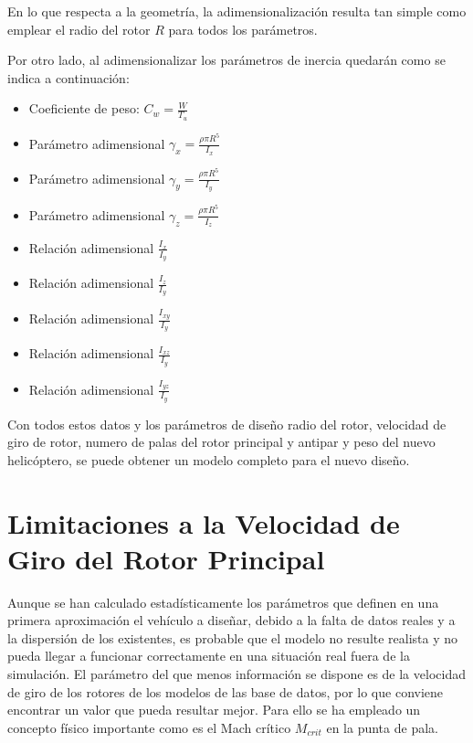 En lo que respecta a la geometría, la adimensionalización resulta tan simple como emplear el radio del rotor $R$ para todos los parámetros.

Por otro lado, al adimensionalizar los parámetros de inercia quedarán como se indica a continuación:

\singlespacing
\begin{multicols}{2}
	\begin{itemize}
		\item Coeficiente de peso: $C_w=\frac{W}{T_u}$
		\item Parámetro adimensional $\gamma_x=\frac{\rho\pi R^5}{I_x}$
		\item Parámetro adimensional $\gamma_y=\frac{\rho\pi R^5}{I_y}$
		\item Parámetro adimensional $\gamma_z=\frac{\rho\pi R^5}{I_z}$
		\item Relación adimensional $\frac{I_x}{I_y}$
		\item Relación adimensional $\frac{I_z}{I_y}$
		\item Relación adimensional $\frac{I_{xy}}{I_y}$
		\item Relación adimensional $\frac{I_{xz}}{I_y}$
		\item Relación adimensional $\frac{I_{yz}}{I_y}$
	\end{itemize}
\end{multicols}

Con todos estos datos y los parámetros de diseño radio del rotor, velocidad de giro de rotor, numero de palas del rotor principal y antipar y peso del nuevo helicóptero, se puede obtener un modelo completo para el nuevo diseño.

\section{Limitaciones a la Velocidad de Giro del Rotor Principal}

Aunque se han calculado estadísticamente los parámetros que definen en una primera aproximación el vehículo a diseñar, debido a la falta de datos reales y a la dispersión de los existentes, es probable que el modelo no resulte realista y no pueda llegar a funcionar correctamente en una situación real fuera de la simulación. El parámetro del que menos información se dispone es de la velocidad de giro de los rotores de los modelos de las base de datos, por lo que conviene encontrar un valor que pueda resultar mejor. Para ello se ha empleado un concepto físico importante como es el Mach crítico $M_{crit}$ en la punta de pala.

